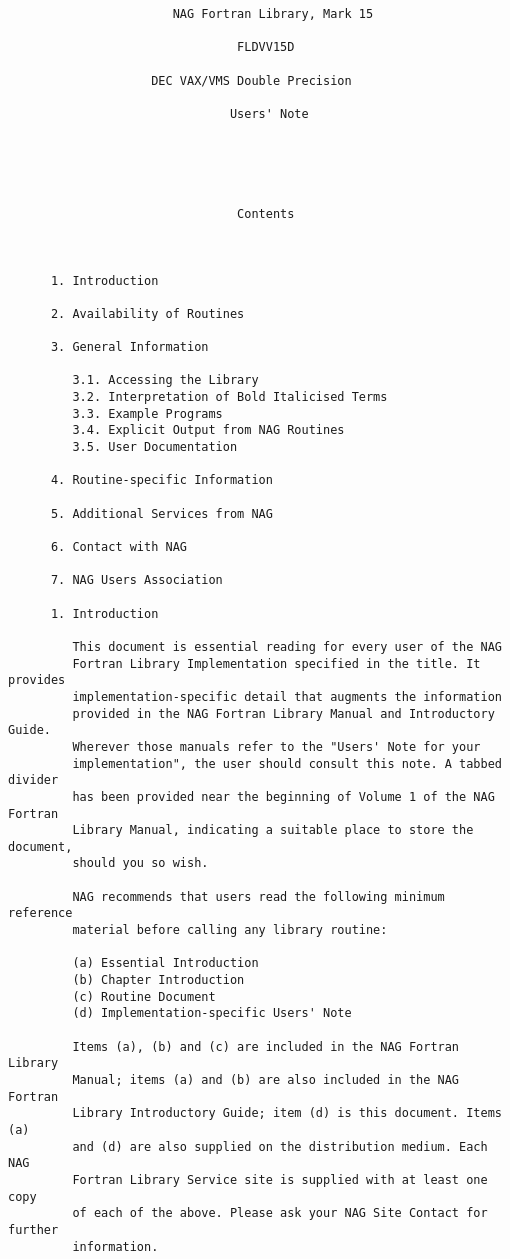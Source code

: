 \begin{small}
\begin{verbatim}
                       NAG Fortran Library, Mark 15

                                FLDVV15D

                    DEC VAX/VMS Double Precision

                               Users' Note





                                Contents



      1. Introduction

      2. Availability of Routines

      3. General Information

         3.1. Accessing the Library
         3.2. Interpretation of Bold Italicised Terms
         3.3. Example Programs
         3.4. Explicit Output from NAG Routines
         3.5. User Documentation

      4. Routine-specific Information

      5. Additional Services from NAG

      6. Contact with NAG

      7. NAG Users Association

      1. Introduction

         This document is essential reading for every user of the NAG
         Fortran Library Implementation specified in the title. It provides
         implementation-specific detail that augments the information
         provided in the NAG Fortran Library Manual and Introductory Guide.
         Wherever those manuals refer to the "Users' Note for your
         implementation", the user should consult this note. A tabbed divider
         has been provided near the beginning of Volume 1 of the NAG Fortran
         Library Manual, indicating a suitable place to store the document,
         should you so wish.

         NAG recommends that users read the following minimum reference
         material before calling any library routine:

         (a) Essential Introduction
         (b) Chapter Introduction
         (c) Routine Document
         (d) Implementation-specific Users' Note

         Items (a), (b) and (c) are included in the NAG Fortran Library
         Manual; items (a) and (b) are also included in the NAG Fortran
         Library Introductory Guide; item (d) is this document. Items (a)
         and (d) are also supplied on the distribution medium. Each NAG
         Fortran Library Service site is supplied with at least one copy
         of each of the above. Please ask your NAG Site Contact for further
         information.


\end{verbatim}
\end{small}
